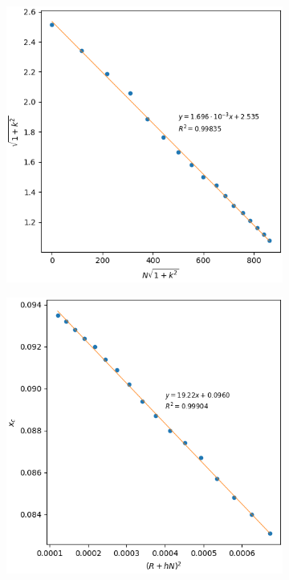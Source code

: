 \begin{figure}
    \centering

    \begin{subfigure}[l]{.49\textwidth}
        \centering
        \includegraphics[width = \textwidth]{S-1}
        \caption{}
    \end{subfigure}
    \hfill
    \begin{subfigure}[l]{.49\textwidth}
        \centering
        \includegraphics[width = \textwidth]{S-2}
        \caption{}
    \end{subfigure}
    
    \caption{}
    \vspace{-.5cm}
\end{figure}

